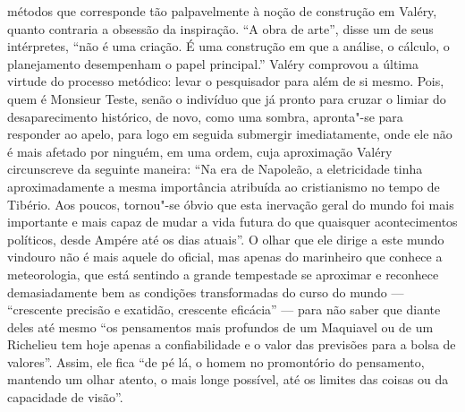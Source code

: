 métodos que corresponde tão palpavelmente à noção de construção em
Valéry, quanto contraria a obsessão da inspiração. ``A obra de arte'',
disse um de seus intérpretes, ``não é uma criação. É uma construção em
que a análise, o cálculo, o planejamento desempenham o papel principal.''
Valéry comprovou a última virtude do processo metódico: levar o
pesquisador para além de si mesmo. Pois, quem é Monsieur Teste, senão o
indivíduo que já pronto para cruzar o limiar do desaparecimento
histórico, de novo, como uma sombra, apronta"-se para responder ao apelo,
para logo em seguida submergir imediatamente, onde ele não é mais
afetado por ninguém, em uma ordem, cuja aproximação Valéry circunscreve
da seguinte maneira: ``Na era de Napoleão, a eletricidade tinha
aproximadamente a mesma importância atribuída ao cristianismo no tempo
de Tibério. Aos poucos, tornou"-se óbvio que esta inervação geral do
mundo foi mais importante e mais capaz de mudar a vida futura do que
quaisquer acontecimentos políticos, desde Ampére até os dias atuais''. O olhar que
ele dirige a este mundo vindouro não é mais aquele do oficial, mas
apenas do marinheiro que conhece a meteorologia, que está sentindo a
grande tempestade se aproximar e reconhece demasiadamente bem as condições
transformadas do curso do mundo --- ``crescente precisão e exatidão,
crescente eficácia'' --- para não saber que diante deles até mesmo ``os
pensamentos mais profundos de um Maquiavel ou de um Richelieu tem hoje apenas
a confiabilidade e o valor das previsões para a bolsa de valores''. Assim,
ele fica ``de pé lá, o homem no promontório do pensamento, mantendo um
olhar atento, o mais longe possível, até os limites das coisas ou da
capacidade de visão''.
